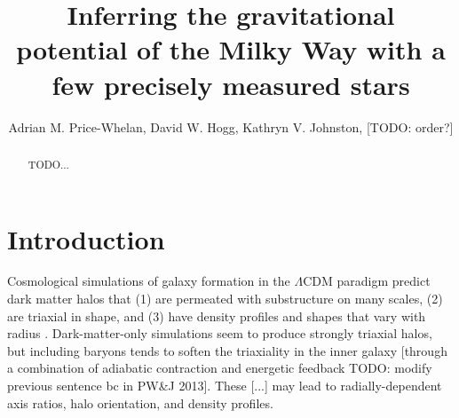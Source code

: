 \documentclass[letterpaper,12pt,preprint]{aastex}
\begin{document}
\title{Inferring the gravitational potential of the Milky Way with a few precisely measured stars}
\author{Adrian M. Price-Whelan, David W. Hogg, Kathryn V. Johnston, [TODO: order?]}

\begin{abstract}
TODO...
\end{abstract}


\section{Introduction}

Cosmological simulations of galaxy formation in the $\Lambda$CDM paradigm predict dark matter halos that (1) are permeated with substructure on many scales, (2) are triaxial in shape, and (3) have density profiles and shapes that vary with radius \citep{dubinski91, jing02, kuhlen07, veraciro11}. Dark-matter-only simulations seem to produce strongly triaxial halos, but including baryons tends to soften the triaxiality in the inner galaxy [through a combination of adiabatic contraction and energetic feedback \citep[see recent discussion by][]{pontzen12} TODO: modify previous sentence bc in PW\&J 2013]. These [...] may lead to radially-dependent axis ratios, halo orientation, and density profiles.
\end{document}
